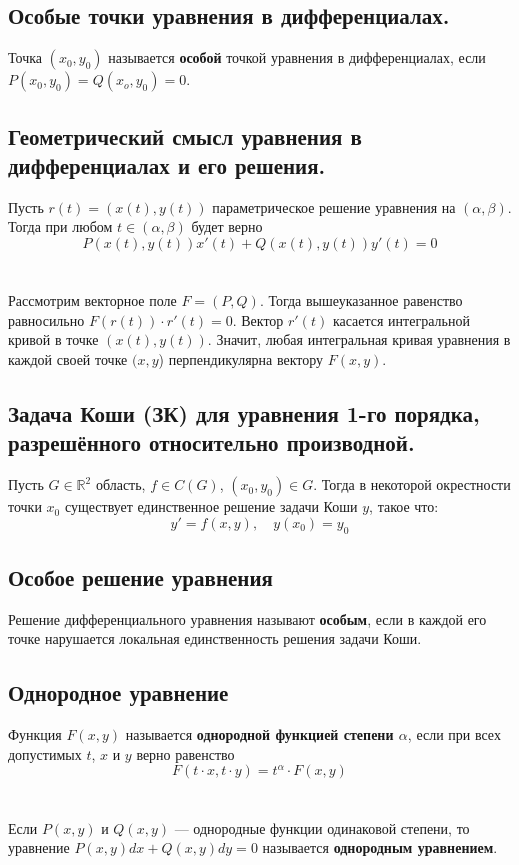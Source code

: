 \documentclass{article}
\begin{document}
\subsection{Особые точки уравнения в дифференциалах.}
Точка $(x_0, y_0)$ называется \textbf{особой} точкой уравнения в дифференциалах, если $P(x_0, y_0) = Q(x_o, y_0) = 0$.

\subsection{Геометрический смысл уравнения в дифференциалах и его решения.}
Пусть $r(t) = (x(t), y(t))$ параметрическое решение уравнения на $(\alpha, \beta)$. Тогда при любом $t \in (\alpha, \beta)$ будет верно
\begin{equation*}
 P(x(t), y(t))x'(t) + Q(x(t), y(t))y'(t) = 0   
\end{equation*}
\\\\
Рассмотрим векторное поле $F = (P, Q)$. Тогда вышеуказанное равенство равносильно $F(r(t)) \cdot r'(t) = 0$. Вектор $r'(t)$ касается интегральной кривой в точке $(x(t), y(t))$. Значит, любая интегральная кривая уравнения в каждой своей точке $(x, y$) перпендикулярна вектору $F(x, y)$.

\subsection{Задача Коши (ЗК) для уравнения 1-го порядка, разрешённого относительно производной.}
Пусть $G \in \mathbb{R}^2$ область, $f \in C(G)$, $(x_0, y_0) \in G$. Тогда в некоторой окрестности точки $x_0$ существует единственное решение задачи Коши $y$, такое что:
\begin{equation*}
    y' = f(x, y), \quad y(x_0) = y_0
\end{equation*}

\subsection{Особое решение уравнения}
Решение дифференциального уравнения называют \textbf{особым}, если в каждой его точке нарушается локальная единственность решения задачи Коши.

\subsection{Однородное уравнение}
Функция $F(x, y)$ называется \textbf{однородной функцией степени $\alpha$}, если при всех допустимых $t$, $x$ и $y$ верно равенство
\begin{equation*}
    F(t\cdot x, t\cdot y) = t^{\alpha} \cdot F(x, y)
\end{equation*}\\\\
Если $P(x, y)$ и $Q(x, y)$ --- однородные функции одинаковой степени, то уравнение $P(x, y)dx + Q(x, y)dy = 0$ называется \textbf{однородным уравнением}.
\end{document}
